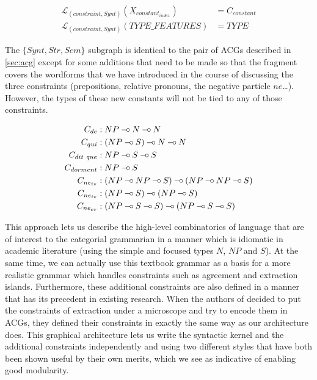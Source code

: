 \begin{align*}
  \mathcal{L}_{(constraint,Synt)}(X_{constant_{index}}) &= C_{constant} \\
  \mathcal{L}_{(constraint,Synt)}(TYPE\_FEATURES)  &= TYPE
\end{align*}

The $\{Synt, Str, Sem\}$ subgraph is identical to the pair of ACGs
described in \ref{sec:acg} except for some additions that need to be
made so that the fragment covers the wordforms that we have introduced
in the course of discussing the three constraints (prepositions,
relative pronouns, the negative particle $ne$\ldots). However, the types
of these new constants will not be tied to any of those constraints.

\begin{align*}
  C_{de} &: NP \limp N \limp N \\
  C_{qui} &: (NP \limp S) \limp N \limp N \\
  C_{dit\ que} &: NP \limp S \limp S \\
  C_{dorment} &: NP \limp S \\
  C_{ne_{tv}} &: (NP \limp NP \limp S) \limp (NP \limp NP \limp S) \\
  C_{ne_{iv}} &: (NP \limp S) \limp (NP \limp S) \\
  C_{ne_{cv}} &: (NP \limp S \limp S) \limp (NP \limp S \limp S)
\end{align*}

This approach lets us describe the high-level combinatorics of language
that are of interest to the categorial grammarian in a manner which is
idiomatic in academic literature (using the simple and focused types
$N$, $NP$ and $S$). At the same time, we can actually use this textbook
grammar as a basis for a more realistic grammar which handles
constraints such as agreement and extraction islands. Furthermore, these
additional constraints are also defined in a manner that has its
precedent in existing research. When the authors of
\cite{pogodalla2012controlling} decided to put the constraints of
extraction under a microscope and try to encode them in ACGs, they
defined their constraints in exactly the same way as our architecture
does. This graphical architecture lets us write the syntactic kernel and
the additional constraints independently and using two different styles
that have both been shown useful by their own merits, which we see as
indicative of enabling good modularity.

